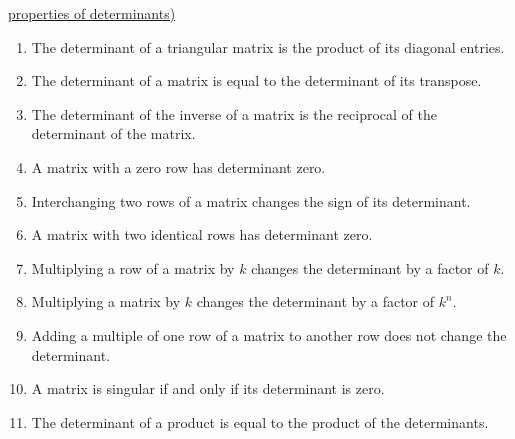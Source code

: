 \documentclass{ximera}
\begin{document}
\href{https://ximera.osu.edu/oerlinalg/LinearAlgebra/DET-0040/main}{properties of determinants)}
\begin{expandable}
\begin{enumerate}
    \item The determinant of a triangular matrix is the product of its diagonal entries.

    \item The determinant of a matrix is equal to the determinant of its transpose.

    \item The determinant of the inverse of a matrix is the reciprocal of the determinant of the matrix.

    \item A matrix with a zero row has determinant zero.

    \item Interchanging two rows of a matrix changes the sign of its determinant.

    \item A matrix with two identical rows has determinant zero.

    \item Multiplying a row of a matrix by $k$ changes the determinant by a factor of $k$.

    \item Multiplying a matrix by $k$ changes the determinant by a factor of $k^n$.

    \item Adding a multiple of one row of a matrix to another row does not change the determinant. 

    \item A matrix is singular if and only if its determinant is zero.

    \item The determinant of a product is equal to the product of the determinants.
\end{enumerate}
\end{expandable}

\end{document}
